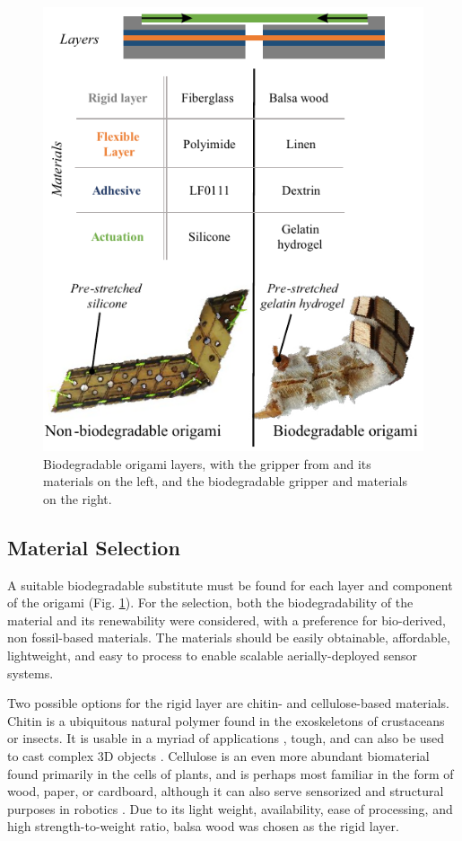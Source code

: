 \begin{figure}[!t]
\centering
\includegraphics[width=1\columnwidth]{chapters/papers/BOG/figures/figure2-biodegrad-layers/figure2-biodegrad-layers.pdf}
\caption{Biodegradable origami layers, with the gripper from \cite{Geckeler2022a} and its materials on the left, and the biodegradable gripper and materials on the right.}
\label{fig2_biodegrad_layers}
\end{figure}

\subsection{Material Selection}
A suitable biodegradable substitute must be found for each layer and component of the origami (Fig. \ref{fig2_biodegrad_layers}). For the selection, both the biodegradability of the material and its renewability were considered, with a preference for bio-derived, non fossil-based materials. The materials should be easily obtainable, affordable, lightweight, and easy to process to enable scalable aerially-deployed sensor systems.

Two possible options for the rigid layer are chitin- and cellulose-based materials. Chitin is a ubiquitous natural polymer found in the exoskeletons of crustaceans or insects. It is usable in a myriad of applications \cite{Elieh-Ali-Komi2016}, tough, and can also be used to cast complex 3D objects  \cite{Fernandez2014}.
Cellulose is an even more abundant biomaterial found primarily in the cells of plants, and is perhaps most familiar in the form of wood, paper, or cardboard, although it can also serve sensorized and structural purposes in robotics \cite{Wiesemuller2021Self-sensingStiffness, Mazzeo2021}. Due to its light weight, availability, ease of processing, and high strength-to-weight ratio, balsa wood was chosen as the rigid layer.

